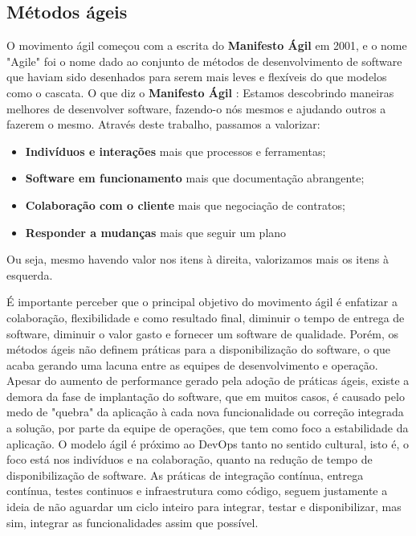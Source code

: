 \documentclass[twoside,english,brazilian]{UNISINOSartigo}
\begin{document}
\subsection{Métodos ágeis}
O movimento ágil começou com a escrita do \textbf{Manifesto Ágil} em 2001, e o nome "Agile" foi o nome dado ao conjunto de métodos de desenvolvimento de software que haviam sido desenhados para serem mais leves e flexíveis do que modelos como o cascata.
O que diz o  \textbf{Manifesto Ágil} :  \newline
Estamos descobrindo maneiras melhores de desenvolver 
software, fazendo-o nós mesmos e ajudando outros a 
fazerem o mesmo. Através deste trabalho, passamos a valorizar: 
\begin{itemize}
\item \textbf{Indivíduos e interações} mais que processos e ferramentas;
\item \textbf{Software em funcionamento} mais que documentação abrangente;
\item \textbf{Colaboração com o cliente} mais que negociação de contratos;
\item \textbf{Responder a mudanças} mais que seguir um plano
\end{itemize}
Ou seja, mesmo havendo valor nos itens à direita, valorizamos mais os itens à esquerda. \newline

É importante perceber que o principal objetivo do movimento ágil é enfatizar a colaboração, flexibilidade e como resultado final, diminuir o tempo de entrega de software, diminuir o valor gasto e fornecer um software de qualidade. Porém, os métodos ágeis não definem práticas para a disponibilização do software, o que acaba gerando uma lacuna entre as equipes de desenvolvimento e operação. Apesar do aumento de performance gerado pela adoção de práticas ágeis, existe a demora da fase de implantação do software, que em muitos casos, é causado pelo medo de "quebra" da aplicação à cada nova funcionalidade ou correção integrada a solução, por parte da equipe de operações, que tem como foco a estabilidade da aplicação.
O modelo ágil é próximo ao DevOps tanto no sentido cultural, isto é, o foco está nos indivíduos e na colaboração, quanto na redução de tempo de disponibilização de software. As práticas de integração contínua, entrega contínua, testes continuos e  infraestrutura como código, seguem justamente a ideia de não aguardar um ciclo inteiro para integrar, testar e disponibilizar, mas sim, integrar as funcionalidades assim que possível.
\end{document}
